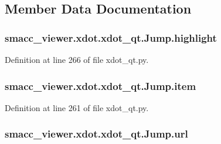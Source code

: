 \subsection{Member Data Documentation}
\subsubsection[{\texorpdfstring{highlight}{highlight}}]{\setlength{\rightskip}{0pt plus 5cm}smacc\+\_\+viewer.\+xdot.\+xdot\+\_\+qt.\+Jump.\+highlight}\hypertarget{classsmacc__viewer_1_1xdot_1_1xdot__qt_1_1Jump_ad50593e5405bad8b183914fe0b7ce965}{}\label{classsmacc__viewer_1_1xdot_1_1xdot__qt_1_1Jump_ad50593e5405bad8b183914fe0b7ce965}


Definition at line 266 of file xdot\+\_\+qt.\+py.

\subsubsection[{\texorpdfstring{item}{item}}]{\setlength{\rightskip}{0pt plus 5cm}smacc\+\_\+viewer.\+xdot.\+xdot\+\_\+qt.\+Jump.\+item}\hypertarget{classsmacc__viewer_1_1xdot_1_1xdot__qt_1_1Jump_a1bc47eb940a7b69fab6a896feba4942b}{}\label{classsmacc__viewer_1_1xdot_1_1xdot__qt_1_1Jump_a1bc47eb940a7b69fab6a896feba4942b}


Definition at line 261 of file xdot\+\_\+qt.\+py.

\subsubsection[{\texorpdfstring{url}{url}}]{\setlength{\rightskip}{0pt plus 5cm}smacc\+\_\+viewer.\+xdot.\+xdot\+\_\+qt.\+Jump.\+url}\hypertarget{classsmacc__viewer_1_1xdot_1_1xdot__qt_1_1Jump_a7261b2ea95bf08591a454101dc96ebdb}{}\label{classsmacc__viewer_1_1xdot_1_1xdot__qt_1_1Jump_a7261b2ea95bf08591a454101dc96ebdb}


